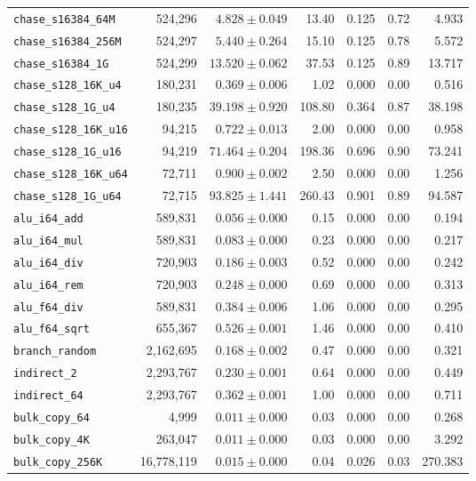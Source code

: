 \begin{table}[t]
\begin{adjustbox}{max width=\textwidth}
\begin{tabular}{lrrrrrr}
\texttt{chase\_s16384\_64M} & 524,296 & $4.828 \pm 0.049$ & 13.40 & 0.125 & 0.72 & 4.933 \\
\texttt{chase\_s16384\_256M} & 524,297 & $5.440 \pm 0.264$ & 15.10 & 0.125 & 0.78 & 5.572 \\
\texttt{chase\_s16384\_1G} & 524,299 & $13.520 \pm 0.062$ & 37.53 & 0.125 & 0.89 & 13.717 \\
\texttt{chase\_s128\_16K\_u4} & 180,231 & $0.369 \pm 0.006$ & 1.02 & 0.000 & 0.00 & 0.516 \\
\texttt{chase\_s128\_1G\_u4} & 180,235 & $39.198 \pm 0.920$ & 108.80 & 0.364 & 0.87 & 38.198 \\
\texttt{chase\_s128\_16K\_u16} & 94,215 & $0.722 \pm 0.013$ & 2.00 & 0.000 & 0.00 & 0.958 \\
\texttt{chase\_s128\_1G\_u16} & 94,219 & $71.464 \pm 0.204$ & 198.36 & 0.696 & 0.90 & 73.241 \\
\texttt{chase\_s128\_16K\_u64} & 72,711 & $0.900 \pm 0.002$ & 2.50 & 0.000 & 0.00 & 1.256 \\
\texttt{chase\_s128\_1G\_u64} & 72,715 & $93.825 \pm 1.441$ & 260.43 & 0.901 & 0.89 & 94.587 \\
\texttt{alu\_i64\_add} & 589,831 & $0.056 \pm 0.000$ & 0.15 & 0.000 & 0.00 & 0.194 \\
\texttt{alu\_i64\_mul} & 589,831 & $0.083 \pm 0.000$ & 0.23 & 0.000 & 0.00 & 0.217 \\
\texttt{alu\_i64\_div} & 720,903 & $0.186 \pm 0.003$ & 0.52 & 0.000 & 0.00 & 0.242 \\
\texttt{alu\_i64\_rem} & 720,903 & $0.248 \pm 0.000$ & 0.69 & 0.000 & 0.00 & 0.313 \\
\texttt{alu\_f64\_div} & 589,831 & $0.384 \pm 0.006$ & 1.06 & 0.000 & 0.00 & 0.295 \\
\texttt{alu\_f64\_sqrt} & 655,367 & $0.526 \pm 0.001$ & 1.46 & 0.000 & 0.00 & 0.410 \\
\texttt{branch\_random} & 2,162,695 & $0.168 \pm 0.002$ & 0.47 & 0.000 & 0.00 & 0.321 \\
\texttt{indirect\_2} & 2,293,767 & $0.230 \pm 0.001$ & 0.64 & 0.000 & 0.00 & 0.449 \\
\texttt{indirect\_64} & 2,293,767 & $0.362 \pm 0.001$ & 1.00 & 0.000 & 0.00 & 0.711 \\
\texttt{bulk\_copy\_64} & 4,999 & $0.011 \pm 0.000$ & 0.03 & 0.000 & 0.00 & 0.268 \\
\texttt{bulk\_copy\_4K} & 263,047 & $0.011 \pm 0.000$ & 0.03 & 0.000 & 0.00 & 3.292 \\
\texttt{bulk\_copy\_256K} & 16,778,119 & $0.015 \pm 0.000$ & 0.04 & 0.026 & 0.03 & 270.383 \\

\end{tabular}
\end{adjustbox}
\end{table}
